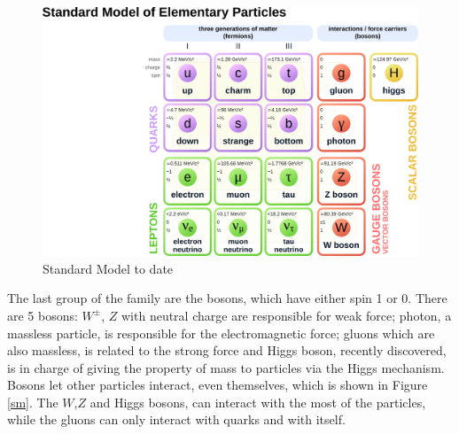 \begin{center}
  \begin{figure}[ht]
    \centering
    \includegraphics[scale=0.3]{Chapter1/sm1.png}
    \caption[Standard Model to date]{Standard Model to date\cite{smtable}}
    \label{sm1}
  \end{figure}
\end{center}
The last group of the family are the bosons, which have either spin 1 or 0. 
There are 5 bosons: $W^{\pm}$, $Z$ with neutral charge are responsible for weak force; photon, a massless particle, is responsible for the electromagnetic force; gluons which are also massless, is related to the strong force and Higgs boson, recently discovered, is in charge of giving the property of mass to particles via the Higgs mechanism. Bosons let other particles interact, even themselves, which is shown in Figure \ref{sm}. 
The $W$,$Z$ and Higgs bosons, can interact with the most of the particles, while the gluons can only interact with quarks and with itself.
